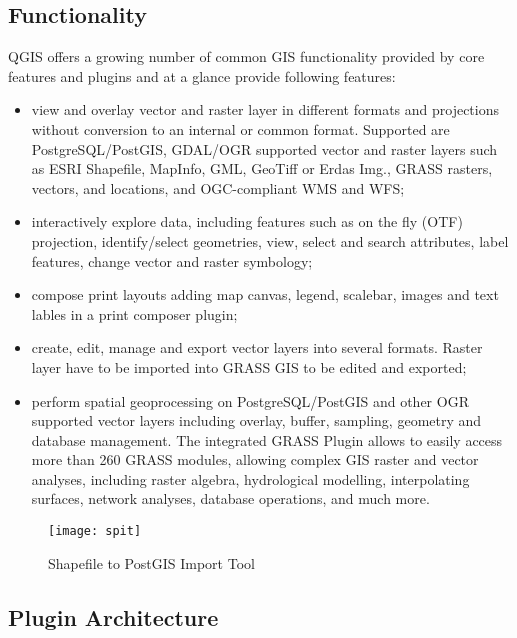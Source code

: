 \subsection{Functionality}

QGIS offers a growing number of common GIS functionality provided by core
features and plugins and at a glance provide following features: 

\begin{itemize}
\item view and overlay vector and raster layer in different formats and
projections without conversion to an internal or common format. Supported are
PostgreSQL/PostGIS, GDAL/OGR supported vector and raster layers such as ESRI
Shapefile, MapInfo, GML, GeoTiff or Erdas Img., GRASS rasters, vectors, and
locations, and
OGC-compliant WMS and WFS;
\item interactively explore data, including features such as on the fly
(OTF) projection, identify/select geometries, view, select and search
attributes, label features, change vector and raster symbology; 
\item compose print layouts adding map canvas, legend, scalebar, images and
text lables in a print composer plugin;
\item create, edit, manage and export vector layers into several formats.
Raster layer have to be imported into GRASS GIS to be edited and
exported;
\item perform spatial geoprocessing on PostgreSQL/PostGIS and other OGR
supported vector layers including overlay, buffer, sampling, geometry and
database management. The integrated GRASS Plugin allows to easily access more
than 260 GRASS modules, allowing complex GIS raster and vector analyses,
including raster algebra, hydrological modelling, interpolating surfaces,
network analyses, database operations, and much more.
\end{itemize}

\begin{figure}[h]
   \begin{center}
   \caption{Shapefile to PostGIS Import Tool}
    \label{fig:spit}\smallskip
   \texttt{[image: spit]}
\end{center}
\end{figure}

\subsection{Plugin Architecture}

